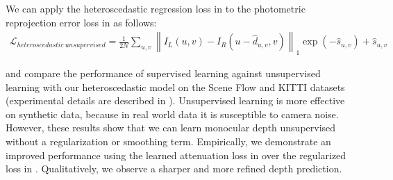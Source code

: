 We can apply the heteroscedastic regression loss in  to the photometric reprojection error loss in  as follows:
\begin{multline}
\mathcal{L}_{heteroscedastic~unsupervised} = \frac{1}{2N} \sum_{u,v} \left\lVert I_L(u,v) - I_R(u-\hat{d}_{u,v},v) \right\rVert_1 \exp (-\hat{s}_{u,v}) + \hat{s}_{u,v}
\label{eqn:aleatoric_unsupervised_loss}
\end{multline}

 and  compare the performance of supervised learning against unsupervised learning with our heteroscedastic model on the Scene Flow and KITTI datasets (experimental details are described in ). Unsupervised learning is more effective on synthetic data, because in real world data it is susceptible to camera noise. However, these results show that we can learn monocular depth unsupervised without a regularization or smoothing term. Empirically, we demonstrate an improved performance using the learned attenuation loss in  over the regularized loss in . Qualitatively, we observe a sharper and more refined depth prediction.

